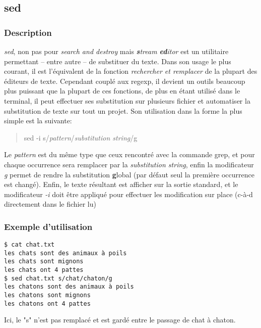 \subsection*{sed}
\subsubsection*{Description}
\emph{sed}, non pas pour \emph{search and destroy} mais \emph{\textbf{s}tream \textbf{ed}itor} est un utilitaire permettant -- entre autre -- de substituer du texte.
Dans son usage le plus courant, il est l'équivalent de la fonction \emph{rechercher et remplacer} de la plupart des éditeurs de texte.
Cependant couplé aux regexp, il devient un outils beaucoup plus puissant que la plupart de ces fonctions, de plus en étant utilisé dans le terminal, il peut effectuer ses substitution sur plusieurs fichier et automatiser la substitution de texte sur tout un projet.
Son utilisation dans la forme la plus simple est la suivante:
\begin{quote}
sed -i s/\emph{pattern}/\emph{substitution string}/g
\end{quote}

Le \emph{pattern} est du même type que ceux rencontré avec la commande grep, et pour chaque occurrence sera remplacer par la \emph{substitution string}, enfin la modificateur \emph{g} permet de rendre la substitution \textbf{g}lobal (par défaut seul la première occurrence est changé).
Enfin, le texte résultant est afficher sur la sortie standard, et le modificateur \emph{-i} doit être appliqué pour effectuer les modification sur place (c-à-d directement dans le fichier lu)

\subsubsection*{Exemple d'utilisation}

\begin{lstlisting}
$ cat chat.txt
les chats sont des animaux à poils
les chats sont mignons
les chats ont 4 pattes
$ sed chat.txt s/chat/chaton/g
les chatons sont des animaux à poils
les chatons sont mignons
les chatons ont 4 pattes
\end{lstlisting}

Ici, le "s" n'est pas remplacé et est gardé entre le passage de chat à chaton.

